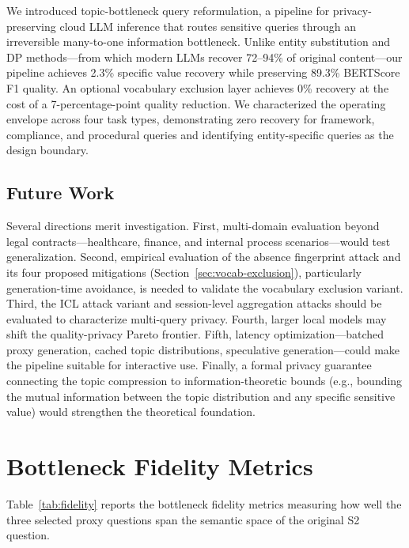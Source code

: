 \documentclass[sigconf,anonymous,review,balance=false]{acmart}
\begin{document}
We introduced topic-bottleneck query reformulation, a pipeline for privacy-preserving cloud LLM inference that routes sensitive queries through an irreversible many-to-one information bottleneck. Unlike entity substitution and DP methods---from which modern LLMs recover 72--94\% of original content---our pipeline achieves 2.3\% specific value recovery while preserving 89.3\% BERTScore F1 quality. An optional vocabulary exclusion layer achieves 0\% recovery at the cost of a 7-percentage-point quality reduction. We characterized the operating envelope across four task types, demonstrating zero recovery for framework, compliance, and procedural queries and identifying entity-specific queries as the design boundary.

\subsection{Future Work}
\label{sec:future}

Several directions merit investigation. First, multi-domain evaluation beyond legal contracts---healthcare, finance, and internal process scenarios---would test generalization. Second, empirical evaluation of the absence fingerprint attack and its four proposed mitigations (Section~\ref{sec:vocab-exclusion}), particularly generation-time avoidance, is needed to validate the vocabulary exclusion variant. Third, the ICL attack variant and session-level aggregation attacks should be evaluated to characterize multi-query privacy. Fourth, larger local models may shift the quality-privacy Pareto frontier. Fifth, latency optimization---batched proxy generation, cached topic distributions, speculative generation---could make the pipeline suitable for interactive use. Finally, a formal privacy guarantee connecting the topic compression to information-theoretic bounds (e.g., bounding the mutual information between the topic distribution and any specific sensitive value) would strengthen the theoretical foundation.

\clearpage



\appendix

\section{Bottleneck Fidelity Metrics}
\label{app:fidelity}

Table~\ref{tab:fidelity} reports the bottleneck fidelity metrics measuring how well the three selected proxy questions span the semantic space of the original S2 question.
\end{document}
